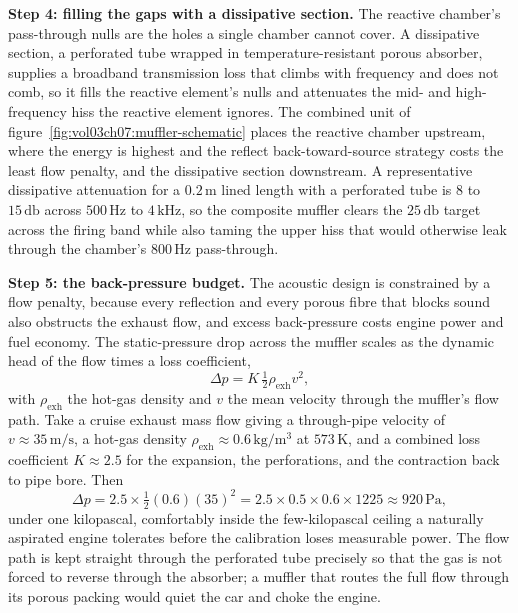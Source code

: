 \textbf{Step 4: filling the gaps with a dissipative section.} The reactive
chamber's pass-through nulls are the holes a single chamber cannot cover. A
dissipative section, a perforated tube wrapped in temperature-resistant
porous absorber, supplies a broadband transmission loss that climbs with
frequency and does not comb, so it fills the reactive element's nulls and
attenuates the mid- and high-frequency hiss the reactive element ignores.
The combined unit of figure~\ref{fig:vol03ch07:muffler-schematic} places
the reactive chamber upstream, where the energy is highest and the reflect
back-toward-source strategy costs the least flow penalty, and the
dissipative section downstream. A representative dissipative attenuation for
a $0.2\,\si{\meter}$ lined length with a perforated tube is $8$ to
$15\,\si{\decibel}$ across $500\,\si{\hertz}$ to $4\,\si{\kilo\hertz}$, so
the composite muffler clears the $25\,\si{\decibel}$ target across the
firing band while also taming the upper hiss that would otherwise leak
through the chamber's $800\,\si{\hertz}$ pass-through.



\textbf{Step 5: the back-pressure budget.} The acoustic design is
constrained by a flow penalty, because every reflection and every porous
fibre that blocks sound also obstructs the exhaust flow, and excess
back-pressure costs engine power and fuel economy. The static-pressure drop
across the muffler scales as the dynamic head of the flow times a loss
coefficient,
\[
\Delta p = K\,\tfrac12 \rho_{\text{exh}} v^2 ,
\]
with $\rho_{\text{exh}}$ the hot-gas density and $v$ the mean velocity
through the muffler's flow path. Take a cruise exhaust mass flow giving a
through-pipe velocity of $v\approx 35\,\si{\meter\per\second}$, a hot-gas
density $\rho_{\text{exh}}\approx 0.6\,\si{\kilogram\per\meter\cubed}$ at
$573\,\si{\kelvin}$, and a combined loss coefficient $K\approx 2.5$ for the
expansion, the perforations, and the contraction back to pipe bore. Then
\[
\Delta p = 2.5\times \tfrac12 (0.6)(35)^2
         = 2.5\times 0.5\times 0.6\times 1225 \approx 920\,\si{\pascal},
\]
under one kilopascal, comfortably inside the few-kilopascal ceiling a
naturally aspirated engine tolerates before the calibration loses
measurable power. The flow path is kept straight through the perforated
tube precisely so that the gas is not forced to reverse through the
absorber; a muffler that routes the full flow through its porous packing
would quiet the car and choke the engine.

